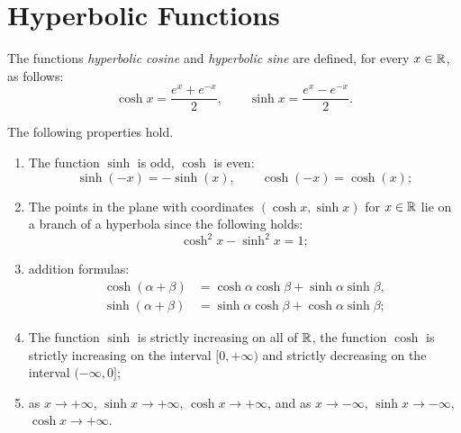 \section{Hyperbolic Functions}

\begin{definition}
The functions \emph{hyperbolic cosine} and \emph{hyperbolic sine} are defined,
for every $x\in {\mathbb R}$, as follows:
\mymargin{$\sinh$, $\cosh$}%
\index{$\sinh$, $\cosh$}%
%
%
%
\index{$\sinh$}%
\index{$\cosh$}%
\begin{equation}
\label{eq:sinh_cosh}
  \cosh x = \frac{e^x + e^{-x}}{2},
  \qquad
  \sinh x = \frac{e^x - e^{-x}}{2}.
\end{equation}
\end{definition}

\begin{theorem}
The following properties hold.
\begin{enumerate}
\item
The function $\sinh$ is odd, $\cosh$ is even:
\[
\sinh(-x) = -\sinh(x),
\qquad
\cosh(-x) = \cosh(x);
\]

\item
The points in the plane with coordinates $(\cosh x, \sinh x)$ for $x\in {\mathbb R}$ lie
on a branch of a hyperbola since the following holds:
\[
  \cosh^2 x - \sinh^2 x = 1;
\]

\item addition formulas:
\begin{align*}
  \cosh(\alpha+\beta) &= \cosh \alpha \cosh \beta + \sinh \alpha \sinh \beta,\\
  \sinh(\alpha+\beta) &= \sinh \alpha \cosh \beta + \cosh \alpha \sinh \beta;
\end{align*}

\item
The function $\sinh$ is strictly increasing on all of ${\mathbb R}$, the function
$\cosh$ is strictly increasing on the interval $[0,+\infty)$ and strictly
decreasing on the interval $(-\infty,0]$;

\item as $x\to +\infty$, $\sinh x \to +\infty$, $\cosh x \to +\infty$, and as $x\to -\infty$, $\sinh x \to -\infty$, $\cosh x \to +\infty$.

\end{enumerate}
\end{theorem}

